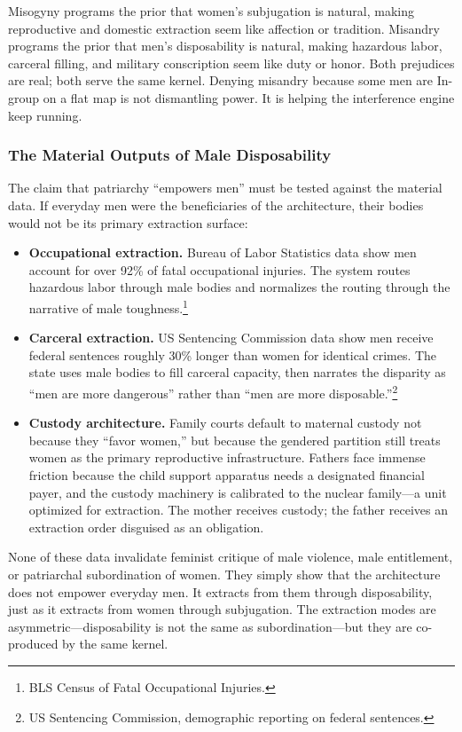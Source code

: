 \documentclass[12pt]{article}
\newcommand{\SourceNote}[1]{\footnote{#1}}
\begin{document}
Misogyny programs the prior that women's subjugation is natural, making reproductive and domestic extraction seem like affection or tradition. Misandry programs the prior that men's disposability is natural, making hazardous labor, carceral filling, and military conscription seem like duty or honor. Both prejudices are real; both serve the same kernel. Denying misandry because some men are In-group on a flat map is not dismantling power. It is helping the interference engine keep running.

\subsubsection{The Material Outputs of Male Disposability}

The claim that patriarchy ``empowers men'' must be tested against the material data. If everyday men were the beneficiaries of the architecture, their bodies would not be its primary extraction surface:

\begin{itemize}
  \item \textbf{Occupational extraction.} Bureau of Labor Statistics data show men account for over 92\% of fatal occupational injuries. The system routes hazardous labor through male bodies and normalizes the routing through the narrative of male toughness.\SourceNote{BLS Census of Fatal Occupational Injuries.}
  \item \textbf{Carceral extraction.} US Sentencing Commission data show men receive federal sentences roughly 30\% longer than women for identical crimes. The state uses male bodies to fill carceral capacity, then narrates the disparity as ``men are more dangerous'' rather than ``men are more disposable.''\SourceNote{US Sentencing Commission, demographic reporting on federal sentences.}
  \item \textbf{Custody architecture.} Family courts default to maternal custody not because they ``favor women,'' but because the gendered partition still treats women as the primary reproductive infrastructure. Fathers face immense friction because the child support apparatus needs a designated financial payer, and the custody machinery is calibrated to the nuclear family---a unit optimized for extraction. The mother receives custody; the father receives an extraction order disguised as an obligation.
\end{itemize}

None of these data invalidate feminist critique of male violence, male entitlement, or patriarchal subordination of women. They simply show that the architecture does not empower everyday men. It extracts from them through disposability, just as it extracts from women through subjugation. The extraction modes are asymmetric---disposability is not the same as subordination---but they are co-produced by the same kernel.
\end{document}
